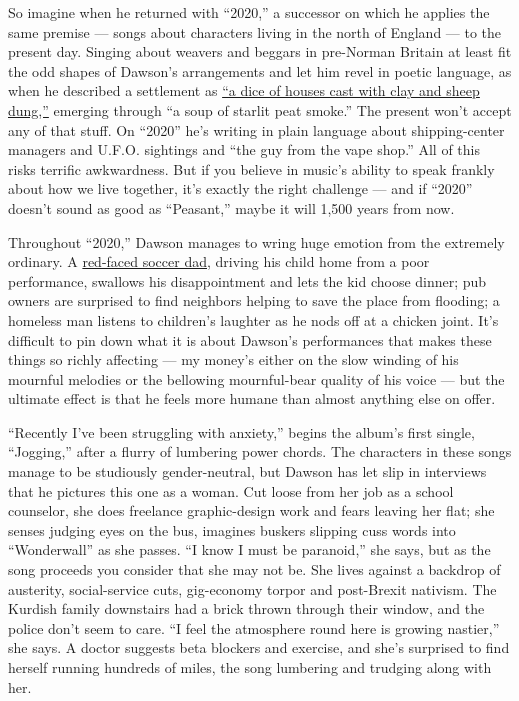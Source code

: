 So imagine when he returned with ``2020,'' a successor on which he
applies the same premise --- songs about characters living in the north
of England --- to the present day. Singing about weavers and beggars in
pre-Norman Britain at least fit the odd shapes of Dawson's arrangements
and let him revel in poetic language, as when he described a settlement
as \href{https://www.youtube.com/watch?v=jfaW-yD7DoA}{``a dice of houses
cast with clay and sheep dung,''} emerging through ``a soup of starlit
peat smoke.'' The present won't accept any of that stuff. On ``2020''
he's writing in plain language about shipping-center managers and U.F.O.
sightings and ``the guy from the vape shop.'' All of this risks terrific
awkwardness. But if you believe in music's ability to speak frankly
about how we live together, it's exactly the right challenge --- and if
``2020'' doesn't sound as good as ``Peasant,'' maybe it will 1,500 years
from now.

Throughout ``2020,'' Dawson manages to wring huge emotion from the
extremely ordinary. A
\href{https://www.youtube.com/watch?v=NkSvn23fbAg}{red-faced soccer
dad}, driving his child home from a poor performance, swallows his
disappointment and lets the kid choose dinner; pub owners are surprised
to find neighbors helping to save the place from flooding; a homeless
man listens to children's laughter as he nods off at a chicken joint.
It's difficult to pin down what it is about Dawson's performances that
makes these things so richly affecting --- my money's either on the slow
winding of his mournful melodies or the bellowing mournful-bear quality
of his voice --- but the ultimate effect is that he feels more humane
than almost anything else on offer.

``Recently I've been struggling with anxiety,'' begins the album's first
single, ``Jogging,'' after a flurry of lumbering power chords. The
characters in these songs manage to be studiously gender-neutral, but
Dawson has let slip in interviews that he pictures this one as a woman.
Cut loose from her job as a school counselor, she does freelance
graphic-design work and fears leaving her flat; she senses judging eyes
on the bus, imagines buskers slipping cuss words into ``Wonderwall'' as
she passes. ``I know I must be paranoid,'' she says, but as the song
proceeds you consider that she may not be. She lives against a backdrop
of austerity, social-service cuts, gig-economy torpor and post-Brexit
nativism. The Kurdish family downstairs had a brick thrown through their
window, and the police don't seem to care. ``I feel the atmosphere round
here is growing nastier,'' she says. A doctor suggests beta blockers and
exercise, and she's surprised to find herself running hundreds of miles,
the song lumbering and trudging along with her.

